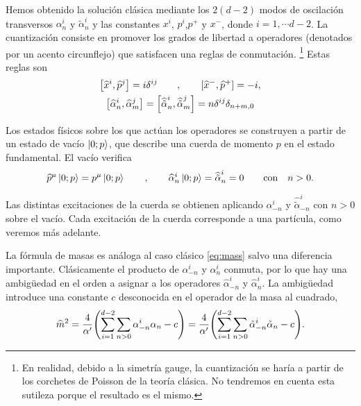 Hemos obtenido la solución clásica mediante los $2(d-2)$ modos de oscilación transversos 
$\alpha^i_n$ y $\tilde \alpha_n^i$ y las constantes $x^i$, $p^i$,$p^+$ y $x^-$, donde $i=1,\cdots d-2$.
La cuantización consiste en promover los grados de libertad a operadores (denotados
por un acento circunflejo) que satisfacen una reglas de conmutación.
\footnote{En realidad, debido a la simetría gauge, la cuantización se haría a partir de los
corchetes de Poisson de la teoría clásica. No tendremos en cuenta esta sutileza porque el
resultado es el mismo.}
Estas reglas son
\begin{equation}
  \begin{gathered}
    \qty[\widehat x^i,\widehat p^j] = i\delta^{ij}\qquad , \qquad [\widehat x^-,\widehat p^+] = -i,\\
    \qty[\widehat \alpha_n^i,\widehat \alpha_m^j]= \qty[\widehat {\tilde \alpha}_n^i,\widehat {\tilde \alpha}_m^j]= n \delta^{ij}\delta_{n+m,0}
  \end{gathered}
\end{equation}

Los estados físicos sobre los que actúan los operadores se construyen a partir de un estado 
de vacío $\ket{0;p}$, que describe una cuerda de momento $p$ en el estado fundamental.
El vacío verifica
\begin{equation}
  \widehat p^\mu \ket{0;p} = p^\mu \ket{0;p} \qquad, \qquad \widehat \alpha^i_n\ket{0;p}=\widehat {\tilde\alpha}^i_n = 0 \qquad \text{con} \quad n>0.
\end{equation}

Las distintas excitaciones de la cuerda se obtienen aplicando $\alpha_{-n}^i$ y $\widehat{\tilde\alpha}_{-n}^i$
con $n>0$ sobre el vacío.
Cada excitación de la cuerda corresponde a una partícula, como veremos más adelante.

La fórmula de masas es análoga al caso clásico \ref{eq:mass} salvo una diferencia importante.
Clásicamente el producto de $\alpha^i_{-n}$ y $\alpha^i_n$ conmuta, por lo que hay una 
ambigüedad en el orden a asignar a los operadores $\widehat\alpha^i_{-n}$ y $\widehat \alpha^i_n$.
La ambigüedad introduce una constante $c$ desconocida en el operador de la masa al cuadrado,
\begin{equation}
  \widehat m^2 = \frac{4}{\alpha'}\qty(\sum_{i=1}^{d-2} \sum_{n>0} \alpha_{-n}^i\alpha_n -c)
   = \frac{4}{\alpha'}\qty(\sum_{i=1}^{d-2} \sum_{n>0} \tilde \alpha_{-n}^i\tilde \alpha_n -c).
\end{equation}

